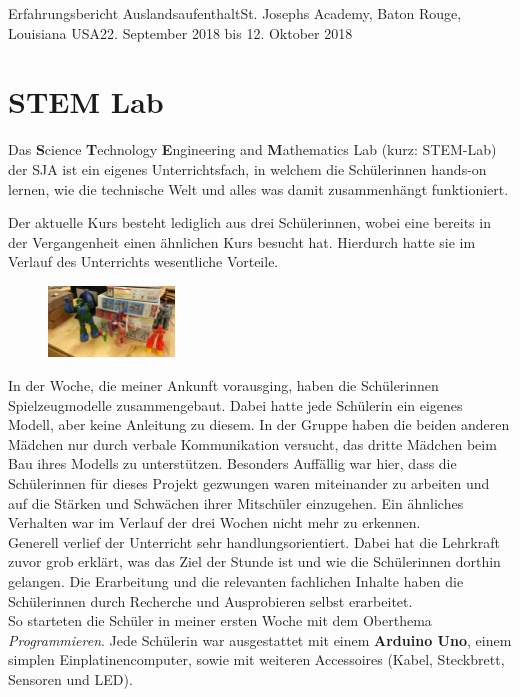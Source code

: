 \documentclass[oneside,openany,headings=optiontotoc,11pt,numbers=noenddot]{article}
\begin{document}
\begin{worksheet}{Erfahrungsbericht Auslandsaufenthalt}{St. Joseph\grq{}s Academy, Baton Rouge, Louisiana USA}{22. September 2018 bis 12. Oktober 2018}
		\section{STEM Lab}
		Das \textbf{S}cience \textbf{T}echnology \textbf{E}ngineering and \textbf{M}athematics Lab (kurz: STEM-Lab) der SJA ist ein eigenes Unterrichtsfach, in welchem die Schülerinnen \grq{}hands-on\grq{} lernen, wie die technische Welt und alles was damit zusammenhängt funktioniert.\\
		\par\noindent
		Der aktuelle Kurs besteht lediglich aus drei Schülerinnen, wobei eine bereits in der Vergangenheit einen ähnlichen Kurs besucht hat. Hierdurch hatte sie im Verlauf des Unterrichts wesentliche Vorteile.\\
		\begin{figure}
			\centering
			\includegraphics[width=0.3\textwidth,align=t]{../99_Bilder/00_comskill.jpg}
		\end{figure}
		In der Woche, die meiner Ankunft vorausging, haben die Schülerinnen Spielzeugmodelle zusammengebaut. Dabei hatte jede Schülerin ein eigenes Modell, aber keine Anleitung zu diesem. In der Gruppe haben die beiden anderen Mädchen nur durch verbale Kommunikation versucht, das dritte Mädchen beim Bau ihres Modells zu unterstützen. Besonders Auffällig war hier, dass die Schülerinnen für dieses Projekt gezwungen waren miteinander zu arbeiten und auf die Stärken und Schwächen ihrer Mitschüler einzugehen. Ein ähnliches Verhalten war im Verlauf der drei Wochen nicht mehr zu erkennen.\\
		Generell verlief der Unterricht sehr handlungsorientiert. Dabei hat die Lehrkraft zuvor grob erklärt, was das Ziel der Stunde ist und wie die Schülerinnen dorthin gelangen. Die Erarbeitung und die relevanten fachlichen Inhalte haben die Schülerinnen durch Recherche und Ausprobieren selbst erarbeitet.\\
		So starteten die Schüler in meiner ersten Woche mit dem Oberthema \textit{Programmieren}. Jede Schülerin war ausgestattet mit einem \textbf{Arduino Uno}, einem simplen Einplatinencomputer, sowie mit weiteren Accessoires (Kabel, Steckbrett, Sensoren und LED).\\
		\begin{center}

\end{center}
\end{worksheet}
\end{document}
